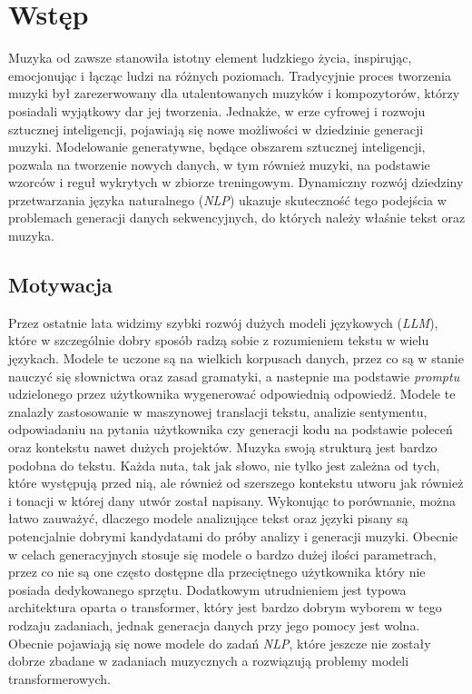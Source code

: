 \documentclass[data-science]{agh-wi} %
\begin{document}
\chapter{Wstęp}
Muzyka od zawsze stanowiła istotny element ludzkiego życia, inspirując, emocjonując i łącząc ludzi na różnych poziomach. Tradycyjnie proces tworzenia muzyki był zarezerwowany dla utalentowanych muzyków i kompozytorów, którzy posiadali wyjątkowy dar jej tworzenia. Jednakże, w erze cyfrowej i rozwoju sztucznej inteligencji, pojawiają się nowe możliwości w dziedzinie generacji muzyki. Modelowanie generatywne, będące obszarem sztucznej inteligencji, pozwala na tworzenie nowych danych, w tym również muzyki, na podstawie wzorców i reguł wykrytych w zbiorze treningowym. Dynamiczny rozwój dziedziny przetwarzania języka naturalnego (\textit{NLP}) ukazuje skuteczność tego podejścia w problemach generacji danych sekwencyjnych, do których należy właśnie tekst oraz muzyka.
\section{Motywacja}
Przez ostatnie lata widzimy szybki rozwój dużych modeli językowych (\textit{LLM}), które w szczególnie dobry sposób radzą sobie z rozumieniem tekstu w wielu językach. Modele te uczone są na wielkich korpusach danych, przez co są w stanie nauczyć się słownictwa oraz zasad gramatyki, a nastepnie ma podstawie \textit{promptu} udzielonego przez użytkownika wygenerować odpowiednią odpowiedź. Modele te znalazły zastosowanie w maszynowej translacji tekstu, analizie sentymentu, odpowiadaniu na pytania użytkownika czy generacji kodu na podstawie poleceń oraz kontekstu nawet dużych projektów. Muzyka swoją strukturą jest bardzo podobna do tekstu. Każda nuta, tak jak słowo, nie tylko jest zależna od tych, które występują przed nią, ale również od szerszego kontekstu utworu jak również i tonacji w której dany utwór został napisany. Wykonując to porównanie, można łatwo zauważyć, dlaczego modele analizujące tekst oraz języki pisany są potencjalnie dobrymi kandydatami do próby analizy i generacji muzyki. Obecnie w celach generacyjnych stosuje się modele o bardzo dużej ilości parametrach, przez co nie są one często dostępne dla przeciętnego użytkownika który nie posiada dedykowanego sprzętu. Dodatkowym utrudnieniem jest typowa architektura oparta o transformer, który jest bardzo dobrym wyborem w tego rodzaju zadaniach, jednak generacja danych przy jego pomocy jest wolna. Obecnie pojawiają się nowe modele do zadań \textit{NLP}, które jeszcze nie zostały dobrze zbadane w zadaniach muzycznych a rozwiązują problemy modeli transformerowych.
\end{document}
